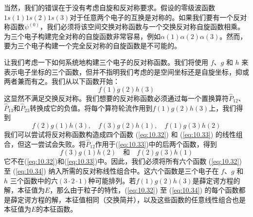     当然，我们的错误在于没有考虑自旋和反对称要求。假设的零级波函数$1s\left(1\right)1s\left(2\right)1s\left(3\right)$对于任意两个电子的互换是对称的。如果我们要有一个反对称函数$\psi^{\left(0\right)}$，我们必须将该空间交换对称函数与一个交换反对称自旋函数相乘。为三个电子构建完全对称的自旋函数非常容易，例如$\alpha\left(1\right)\alpha\left(2\right)\alpha\left(3\right)$。然而，要为三个电子构建一个完全反对称的自旋函数是不可能的。

    让我们考虑一下如何系统地构建三个电子的反对称函数。我们将使用 $f$、$g$ 和 $h$ 来表示电子坐标的三个函数，但并不指明我们考虑的是空间坐标还是自旋坐标，抑或两者兼而有之。我们从以下函数开始：
    \begin{equation}
        f\left(1\right)g\left(2\right)h\left(3\right)
        \label{eq:10.32}
    \end{equation}
    这显然不满足交换反对称。我们想要的反对称函数必须通过每一个置换算符$\hat{P}_{12}$、$\hat{P}_{13}$和$\hat{P}_{23}$转换成它的负值。将每个算符轮流作用到$f\left(1\right)g\left(2\right)h\left(3\right)$上，我们得到
    \begin{equation}
        f\left(2\right)g\left(1\right)h\left(3\right), \quad f\left(3\right)g\left(2\right)h\left(1\right), \quad f\left(1\right)g\left(3\right)h\left(2\right)
        \label{eq:10.33}
    \end{equation}
    我们可以尝试将反对称函数构造成四个函数 (\ref{eq:10.32}) 和 (\ref{eq:10.33}) 的线性组合，但这一尝试会失败。将$\hat{P}_{12}$作用于(\ref{eq:10.33})中的后两个函数，得到
    \begin{equation}
        f\left(3\right)g\left(1\right)h\left(2\right) \quad \text{和} \quad f\left(2\right)g\left(3\right)h\left(1\right)
        \label{eq:10.34}
    \end{equation}
    它不在(\ref{eq:10.32})和(\ref{eq:10.33})中。因此，我们必须将所有六个函数 (\ref{eq:10.32}) 至 (\ref{eq:10.34}) 纳入所需的反对称线性组合中。这六个函数是三个电子在 $f$、$g$ 和 $h$ 三个函数中的六$\left(3 \cdot 2 \cdot 1\right)$种可能排列。若$f\left(1\right)g\left(2\right)h\left(3\right)$是薛定谔方程的解，本征值为$E$，那么由于粒子的特性，(\ref{eq:10.32}) 至 (\ref{eq:10.34}) 的每个函数都是薛定谔方程的解，本征值相同（交换简并），以及这些函数的任意线性组合也是本征值为$E$的本征函数。

